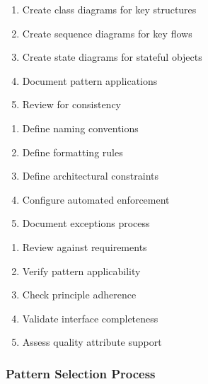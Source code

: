 \documentclass[11pt,letterpaper]{article}
\begin{document}
\begin{guidancebox}
\begin{enumerate}[nosep]
    \item Create class diagrams for key structures
    \item Create sequence diagrams for key flows
    \item Create state diagrams for stateful objects
    \item Document pattern applications
    \item Review for consistency
\end{enumerate}
\end{guidancebox}

\begin{guidancebox}
\begin{enumerate}[nosep]
    \item Define naming conventions
    \item Define formatting rules
    \item Define architectural constraints
    \item Configure automated enforcement
    \item Document exceptions process
\end{enumerate}
\end{guidancebox}

\begin{guidancebox}
\begin{enumerate}[nosep]
    \item Review against requirements
    \item Verify pattern applicability
    \item Check principle adherence
    \item Validate interface completeness
    \item Assess quality attribute support
\end{enumerate}
\end{guidancebox}

\subsubsection{Pattern Selection Process}
\end{document}
